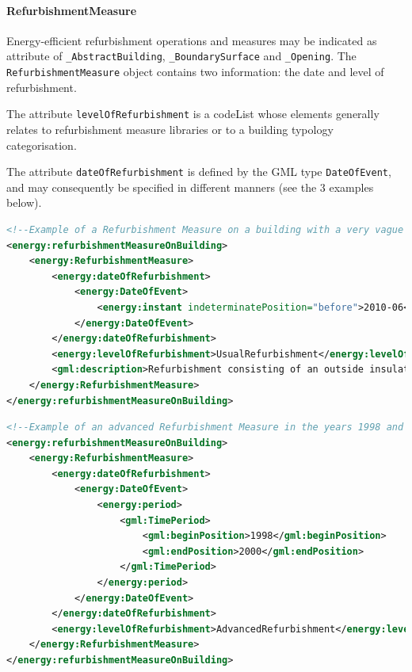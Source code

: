 \documentclass[a4paper,12pt]{article}
\begin{document}
\paragraph{RefurbishmentMeasure}\label{refurbishmentmeasure}

Energy-efficient refurbishment operations and measures may be indicated
as attribute of \lstinline!_AbstractBuilding!,
\lstinline!_BoundarySurface! and \lstinline!_Opening!. The
\lstinline!RefurbishmentMeasure! object contains two information: the
date and level of refurbishment.

The attribute \lstinline!levelOfRefurbishment! is a codeList whose
elements generally relates to refurbishment measure libraries or to a
building typology categorisation.

The attribute \lstinline!dateOfRefurbishment! is defined by the GML type
\lstinline!DateOfEvent!, and may consequently be specified in different
manners (see the 3 examples below).

\begin{lstlisting}[language=XML]
<!--Example of a Refurbishment Measure on a building with a very vague date ("before June 2010") -->
<energy:refurbishmentMeasureOnBuilding>
    <energy:RefurbishmentMeasure>
        <energy:dateOfRefurbishment>
            <energy:DateOfEvent>
                <energy:instant indeterminatePosition="before">2010-06</energy:instant>
            </energy:DateOfEvent>
        </energy:dateOfRefurbishment>
        <energy:levelOfRefurbishment>UsualRefurbishment</energy:levelOfRefurbishment>
        <gml:description>Refurbishment consisting of an outside insulation of walls etc.</gml:description>
    </energy:RefurbishmentMeasure>
</energy:refurbishmentMeasureOnBuilding>
\end{lstlisting}

\begin{lstlisting}[language=XML]
<!--Example of an advanced Refurbishment Measure in the years 1998 and 1999 -->
<energy:refurbishmentMeasureOnBuilding>
    <energy:RefurbishmentMeasure>
        <energy:dateOfRefurbishment>
            <energy:DateOfEvent>
                <energy:period>
                    <gml:TimePeriod>
                        <gml:beginPosition>1998</gml:beginPosition>
                        <gml:endPosition>2000</gml:endPosition>
                    </gml:TimePeriod>
                </energy:period>
            </energy:DateOfEvent>
        </energy:dateOfRefurbishment>
        <energy:levelOfRefurbishment>AdvancedRefurbishment</energy:levelOfRefurbishment>
    </energy:RefurbishmentMeasure>
</energy:refurbishmentMeasureOnBuilding>
\end{lstlisting}
\end{document}
